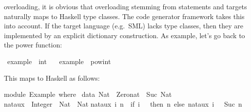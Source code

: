\begin{isabellebody}
\begin{isamarkuptext}
  overloading, it is obvious that overloading stemming from \hyperlink{command.class}{\mbox{}} statements and \hyperlink{command.instantiation}{\mbox{}} targets naturally
  maps to Haskell type classes.  The code generator framework
  \cite{isabelle-codegen} takes this into account.  If the target
  language (e.g.~SML) lacks type classes, then they are implemented by
  an explicit dictionary construction.  As example, let's go back to
  the power function:%
\end{isamarkuptext}%
\isamarkuptrue%
%
\isadelimquote
%
\endisadelimquote
%
\isatagquote
{}\isamarkupfalse%
\ example\ {}{}\ int\ \isanewline
\ \ {}example\ {}\ pow{}int\ {}{}\ {}{}{}{}{}%
\endisatagquote
{\isafoldquote}%
%
\isadelimquote
%
\endisadelimquote
%
\begin{isamarkuptext}%
\noindent This maps to Haskell as follows:%
\end{isamarkuptext}%
\isamarkuptrue%
%
\isadeliminvisible
%
\endisadeliminvisible
%
\isataginvisible
%
\endisataginvisible
{\isafoldinvisible}%
%
\isadeliminvisible
%
\endisadeliminvisible
%
\isadelimquotetypewriter
%
\endisadelimquotetypewriter
%
\isatagquotetypewriter
%
\begin{isamarkuptext}%
module\ Example\ where\ {}\isanewline
\isanewline
data\ Nat\ {}\ Zero{}nat\ {}\ Suc\ Nat{}\isanewline
\isanewline
nat{}aux\ {}{}\ Integer\ {}{}\ Nat\ {}{}\ Nat{}\isanewline
nat{}aux\ i\ n\ {}\ {}if\ i\ {}{}\ {}\ then\ n\ else\ nat{}aux\ {}i\ {}\ {}{}\ {}Suc\ n{}{}{}\isanewline

\end{isamarkuptext}
\end{isabellebody}
